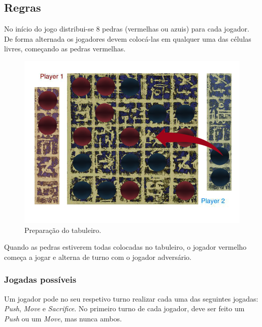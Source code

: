 \documentclass[a4paper]{article}
\begin{document}
\newpage

\subsection{Regras}

No início do jogo distribui-se 8 pedras (vermelhas ou azuis) para cada jogador. De forma alternada os jogadores devem colocá-las em qualquer uma das células livres, começando as pedras vermelhas.

\begin{figure}[!htb]
	\centering
	\includegraphics[scale=0.3]{images/board_prep.png}
	\caption{Preparação do tabuleiro.}
\end{figure}

Quando as pedras estiverem todas colocadas no tabuleiro, o jogador vermelho começa a jogar e alterna de turno com o jogador adversário.

\subsubsection{Jogadas possíveis}

Um jogador pode no seu respetivo turno realizar cada uma das seguintes jogadas: \textit{Push}, \textit{Move} e \textit{Sacrifice}.
No primeiro turno de cada jogador, deve ser feito um \textit{Push} ou um \textit{Move}, mas nunca ambos.
\end{document}
